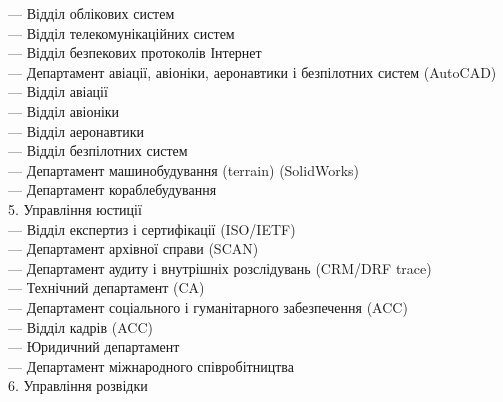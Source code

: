 \hspace{4cm}         — Відділ облікових систем \\
\hspace{4cm}         — Відділ телекомунікаційних систем \\
\hspace{4cm}         — Відділ безпекових протоколів Інтернет \\
\hspace{2cm}     — Департамент авіації, авіоніки, аеронавтики і безпілотних систем (AutoCAD) \\
\hspace{4cm}         — Відділ авіації \\
\hspace{4cm}         — Відділ авіоніки \\
\hspace{4cm}         — Відділ аеронавтики \\
\hspace{4cm}         — Відділ безпілотних систем \\
\hspace{2cm}     — Департамент машинобудування (terrain) (SolidWorks) \\
\hspace{2cm}     — Департамент кораблебудування \\
5. Управління юстиції \\
\hspace{2cm}     — Відділ експертиз і сертифікації (ISO/IETF) \\
\hspace{2cm}     — Департамент архівної справи (SCAN) \\
\hspace{2cm}     — Департамент аудиту і внутрішніх розслідувань (CRM/DRF trace) \\
\hspace{2cm}     — Технічний департамент (CA) \\
\hspace{2cm}     — Департамент соціального і гуманітарного забезпечення (ACC) \\
\hspace{2cm}     — Відділ кадрів (ACC) \\
\hspace{2cm}     — Юридичний департамент \\
\hspace{2cm}     — Департамент міжнародного співробітництва \\
6. Управління розвідки \\
